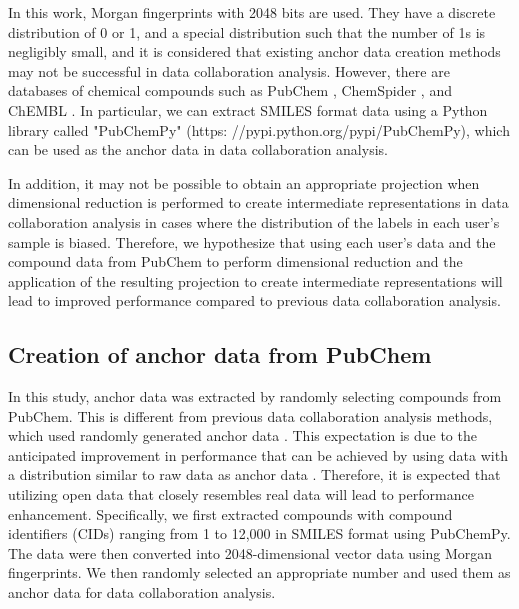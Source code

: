 \documentclass{article}
\begin{document}
In this work, Morgan fingerprints with 2048 bits are used. They have a discrete distribution of 0 or 1, and a special distribution such that the number of 1s is negligibly small, and it is considered that existing anchor data creation methods may not be successful in data collaboration analysis. However, there are databases of chemical compounds such as PubChem \cite{wang2009pubchem}, ChemSpider \cite{pence2010chemspider}, and ChEMBL \cite{gaulton2012chembl}. In particular, we can extract SMILES format data using a Python library called "PubChemPy" (https: //pypi.python.org/pypi/PubChemPy), which can be used as the anchor data in data collaboration analysis.

In addition, it may not be possible to obtain an appropriate projection when dimensional reduction is performed to create intermediate representations in data collaboration analysis in cases where the distribution of the labels in each user's sample is biased. Therefore, we hypothesize that using each user's data and the compound data from PubChem to perform dimensional reduction and the application of the resulting projection to create intermediate representations will lead to improved performance compared to previous data collaboration analysis.

\subsection{Creation of anchor data from PubChem}
\label{sec:sample1}
In this study, anchor data was extracted by randomly selecting compounds from PubChem. This is different from previous data collaboration analysis methods, which used randomly generated anchor data \cite{imakura2020data}. %
This expectation is due to the anticipated improvement in performance that can be achieved by using data with a distribution similar to raw data as anchor data \cite{imakura2023another}. Therefore, it is expected that utilizing open data that closely resembles real data will lead to performance enhancement.
Specifically, we first extracted compounds with compound identifiers (CIDs) ranging from 1 to 12,000 in SMILES format using PubChemPy. The data were then converted into 2048-dimensional vector data using Morgan fingerprints. We then randomly selected an appropriate number and used them as anchor data for data collaboration analysis.
\end{document}
